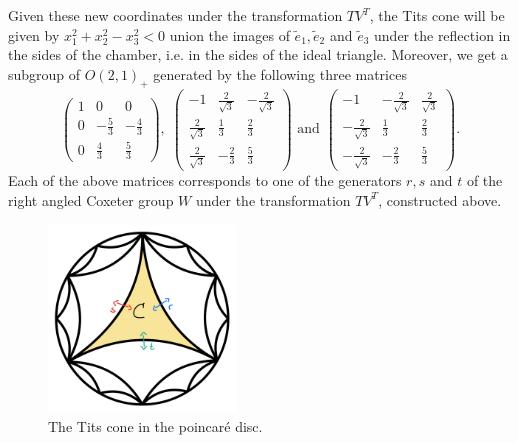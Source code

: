 Given these new coordinates under the transformation \(TV^T\), the Tits cone will be given by \(x_1^2 + x_2^2 - x_3^2 < 0\) union the images of \(\widetilde{e}_1, \widetilde{e}_2\) and \(\widetilde{e}_3\) under the reflection in the sides of the chamber, i.e. in the sides of the ideal triangle. %
Moreover, we get a subgroup of \(O(2,1)_+\) generated by the following three matrices
\begin{equation*}
    \begin{pmatrix} 1 & 0 & 0 \\ 0 & -\frac{5}{3} & -\frac{4}{3} \\ 0 & \frac{4}{3} & \frac{5}{3} \end{pmatrix},\;
    \begin{pmatrix} -1 & \frac{2}{\sqrt{3}} & -\frac{2}{\sqrt{3}} \\ \frac{2}{\sqrt{3}} & \frac{1}{3} & \frac{2}{3} \\ \frac{2}{\sqrt{3}} & -\frac{2}{3} & \frac{5}{3} \end{pmatrix}
    \text{ and }
    \begin{pmatrix} -1 & -\frac{2}{\sqrt{3}} & \frac{2}{\sqrt{3}} \\ -\frac{2}{\sqrt{3}} & \frac{1}{3} & \frac{2}{3} \\ -\frac{2}{\sqrt{3}} & -\frac{2}{3} & \frac{5}{3} \end{pmatrix}.
\end{equation*}
Each of the above matrices corresponds to one of the generators \(r, s\) and \(t\) of the right angled Coxeter group \(W\) under the transformation \(TV^T\), constructed above.

\begin{figure}[h!]
    \label{fig:titsconeex}
    \centering
    \includegraphics[width=5cm]{gfx/Tits cone example poincare.png}
    \caption{The Tits cone in the poincaré disc.}
\end{figure}\vspace*{-\parskip}


